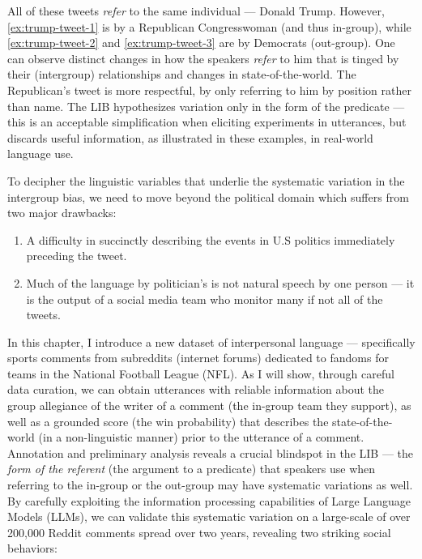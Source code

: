 All of these tweets \emph{refer} to the same individual --- Donald Trump. However, \ref{ex:trump-tweet-1} is by a Republican Congresswoman (and thus in-group), while \ref{ex:trump-tweet-2} and \ref{ex:trump-tweet-3} are by Democrats (out-group). One can observe distinct changes in how the speakers \emph{refer} to him that is tinged by their (intergroup) relationships and changes in state-of-the-world. The Republican's tweet is more respectful, by only referring to him by position rather than name.  The LIB hypothesizes variation only in the form of the predicate --- this is an acceptable simplification when eliciting experiments in utterances, but discards useful information, as illustrated in these examples, in real-world language use.

To decipher the linguistic variables that underlie the systematic variation in the intergroup bias, we need to move beyond the political domain which suffers from two major drawbacks:

\begin{enumerate}
    \item A difficulty in succinctly describing the events in U.S politics immediately preceding the tweet.
    \item Much of the language by politician's is not natural speech by one person --- it is the output of a social media team who monitor many if not all of the tweets.
\end{enumerate} 

In this chapter, I introduce a new dataset of interpersonal language --- specifically sports comments from subreddits (internet forums) dedicated to fandoms for teams in the National Football League (NFL). As I will show, through careful data curation, we can obtain utterances with reliable information about the group allegiance of the writer of a comment (the in-group team they support), as well as a grounded score (the win probability) that describes the state-of-the-world (in a non-linguistic manner) prior to the utterance of a comment. Annotation and preliminary analysis reveals a crucial blindspot in the LIB --- the \emph{form of the referent} (the argument to a predicate) that speakers use when referring  to the in-group or the out-group may have systematic variations as well. By carefully exploiting the information processing capabilities of Large Language Models (LLMs), we can validate this systematic variation on a large-scale of over 200,000 Reddit comments spread over two years, revealing two striking social behaviors:

